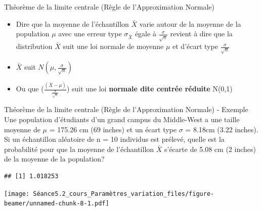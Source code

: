 \documentclass[
  ignorenonframetext,
]{beamer}
\begin{document}
\begin{frame}{Théorème de la limite centrale (Règle de l'Approximation
Normale)}
\protect\hypertarget{thuxe9oruxe8me-de-la-limite-centrale-ruxe8gle-de-lapproximation-normale}{}
\begin{itemize}
\item
  Dire que la moyenne de l'échantillon \(\bar{X}\) varie autour de la
  moyenne de la population \(\mu\) avec une erreur type
  \(\sigma_{\bar{X}}\) égale à \(\frac{\sigma}{\sqrt{n}}\) revient à
  dire que la distribution \(\bar{X}\) suit une loi normale de moyenne
  \(\mu\) et d'écart type \(\frac{\sigma}{\sqrt{n}}\)
\item
  \(\bar{X}\) suit \(N(\mu, \frac{\sigma}{\sqrt{n}})\)
\item
  Ou que (\(\frac{(\bar{X}-\mu)}{\frac{\sigma}{\sqrt{n}}}\)) suit une
  loi \textbf{normale dite centrée réduite} N(0,1)
\end{itemize}
\end{frame}

\begin{frame}[fragile]{Théorème de la limite centrale (Règle de
l'Approximation Normale) - Exemple}
\protect\hypertarget{thuxe9oruxe8me-de-la-limite-centrale-ruxe8gle-de-lapproximation-normale---exemple}{}
Une population d'étudiants d'un grand campus du Middle-West a une taille
moyenne de \(\mu\) = 175.26 cm (69 inches) et un écart type \(\sigma\) =
8.18cm (3.22 inches). Si un échantillon aléatoire de n = 10 individus
est prélevé, quelle est la probabilité pour que la moyenne de
l'échantillon \(\bar{X}\) s'écarte de 5.08 cm (2 inches) de la moyenne
de la population?

\begin{verbatim}
## [1] 1.018253
\end{verbatim}

\texttt{[image: Séance5.2\_cours\_Paramètres\_variation\_files/figure-beamer/unnamed-chunk-8-1.pdf]}
\end{frame}
\end{document}
